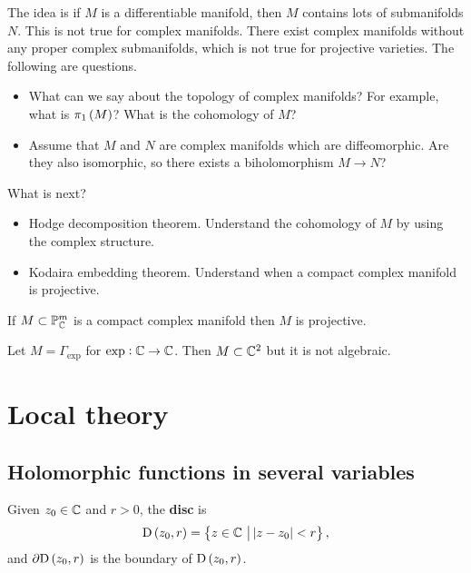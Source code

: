 The idea is if $ M $ is a differentiable manifold, then $ M $ contains lots of submanifolds $ N $. This is not true for complex manifolds. There exist complex manifolds without any proper complex submanifolds, which is not true for projective varieties. The following are questions.
\begin{itemize}
\item What can we say about the topology of complex manifolds? For example, what is $ \pi_1\br{M} $? What is the cohomology of $ M $?
\item Assume that $ M $ and $ N $ are complex manifolds which are diffeomorphic. Are they also isomorphic, so there exists a biholomorphism $ M \to N $?
\end{itemize}
What is next?
\begin{itemize}
\item Hodge decomposition theorem. Understand the cohomology of $ M $ by using the complex structure.
\item Kodaira embedding theorem. Understand when a compact complex manifold is projective.
\end{itemize}

\begin{note*}
If $ M \subset \mathbb{P}_{\mathbb{C}}^m $ is a compact complex manifold then $ M $ is projective.
\end{note*}

\begin{example*}
Let $ M = \Gamma_{\exp} $ for $ \exp : \mathbb{C} \to \mathbb{C} $. Then $ M \subset \mathbb{C}^2 $ but it is not algebraic.
\end{example*}

\pagebreak

\section{Local theory}

\subsection{Holomorphic functions in several variables}


\begin{notation}
Given $ z_0 \in \mathbb{C} $ and $ r > 0 $, the \textbf{disc} is
$$ \D\br{z_0, r} = \cbr{z \in \CC \st \abs{z - z_0} < r}, $$
and $ \partial\D\br{z_0, r} $ is the boundary of $ \D\br{z_0, r} $.
\end{notation}

